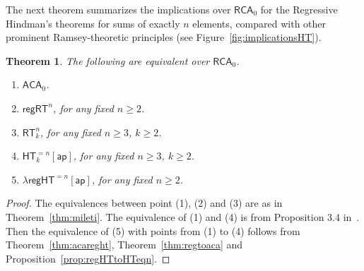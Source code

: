 \documentclass[a4paper,11pt]{article}
\newtheorem{theorem}{Theorem}
\newcommand\RCA{\mathsf{RCA}}
\newcommand\ACA{\mathsf{ACA}}
\newcommand\HT{\mathsf{HT}}
\newcommand\RT{\mathsf{RT}}
\newcommand\regHT{\mathsf{regHT}}
\newcommand\REG{\mathsf{regRT}}
\newcommand\ap{\mathsf{ap}}
\begin{document}

The next theorem summarizes the implications over $\RCA_0$ for the Regressive Hindman's theorems
for sums of exactly $n$ elements, compared with other prominent Ramsey-theoretic principles (see  
Figure~\ref{fig:implicationsHT}).

\begin{theorem}
The following are equivalent over $\RCA_0$. 
\begin{enumerate}
\item $\ACA_0$.
\item $\REG^n$, for any fixed $n\geq 2$.
\item $\RT^n_k$, for any fixed $n\geq 3$, $k \geq 2$.
\item $\HT^{=n}_k[\ap]$, for any fixed $n \geq 3$, $k \geq 2$. 
\item $\lambda\regHT^{=n}[\ap]$, for any fixed $n \geq 2$.
\end{enumerate}
\end{theorem}

\begin{proof}
The equivalences between point (1), (2) and (3) are as in Theorem~\ref{thm:mileti}. The equivalence of 
(1) and (4) is from Proposition 3.4 in~\cite{Car-Kol-Lep-Zda:20}. Then the equivalence of (5) with points from (1) to (4) follows from Theorem~\ref{thm:acareght}, Theorem~\ref{thm:regtoaca} and Proposition~\ref{prop:regHTtoHTeqn}. 
\end{proof}
\end{document}
